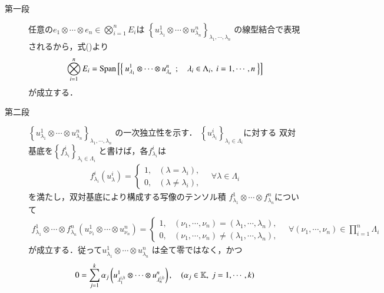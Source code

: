 	\begin{prf}\mbox{}
		\begin{description}
			\item[第一段]
				任意の$e_1 \otimes \cdots \otimes e_n \in \bigotimes_{i=1}^n E_i$は
				$\left\{ u^1_{\lambda_1} \otimes \cdots \otimes u^n_{\lambda_n} 
				\right\}_{\lambda_1,\cdots,\lambda_n}$
				の線型結合で表現されるから，式()より
				\begin{align}
					\bigotimes_{i=1}^n E_i = \mathrm{Span}\left[ \left\{\ u^1_{\lambda_1} \otimes 
				\cdots \otimes u^n_{\lambda_n}\ \, ; \quad \lambda_i \in \Lambda_i,\ i=1,\cdots,n\ \right\} \right]
				\end{align}
				が成立する．
				
			\item[第二段]
				$\left\{ u^1_{\lambda_1} \otimes 
				\cdots \otimes u^n_{\lambda_n} \right\}_{\lambda_1,\cdots,\lambda_n}$
				の一次独立性を示す．
				$\left\{ u^i_{\lambda_i} \right\}_{\lambda_i \in \Lambda_i}$に対する
				双対基底を$\left\{ f^i_{\lambda_i} \right\}_{\lambda_i \in \Lambda_i}$
				と書けば，各$f^i_{\lambda_i}$は
				\begin{align}
					f^i_{\lambda_i}(u^i_\lambda) =
					\begin{cases}
						1, & (\lambda = \lambda_i), \\
						0, & (\lambda \neq \lambda_i),
					\end{cases}
					\quad \forall \lambda \in \Lambda_i
				\end{align}
				を満たし，双対基底により構成する写像のテンソル積
				$f^1_{\lambda_1} \otimes \cdots \otimes f^n_{\lambda_n}$について
				\begin{align}
					f^1_{\lambda_1} \otimes \cdots \otimes f^n_{\lambda_n}(u^1_{\nu_1} \otimes 
					\cdots \otimes u^n_{\nu_n}) = 
					\begin{cases}
						1, & (\nu_1,\cdots,\nu_n) = (\lambda_1,\cdots,\lambda_n), \\
						0, & (\nu_1,\cdots,\nu_n) \neq (\lambda_1,\cdots,\lambda_n),
					\end{cases}
					\quad \forall (\nu_1,\cdots,\nu_n) \in \prod_{i=1}^n \Lambda_i
				\end{align}
				が成立する．従って$u^1_{\lambda_1} \otimes \cdots \otimes u^n_{\lambda_n}$
				は全て零ではなく，かつ
				\begin{align}
					0 = \sum_{j=1}^k \alpha_j \left(u^1_{\lambda^{(j)}_1} \otimes 
					\cdots \otimes u^n_{\lambda^{(j)}_n} \right),
					\quad (\alpha_j \in \K,\ j=1,\cdots,k)

\end{align}
\end{description}
\end{prf}
